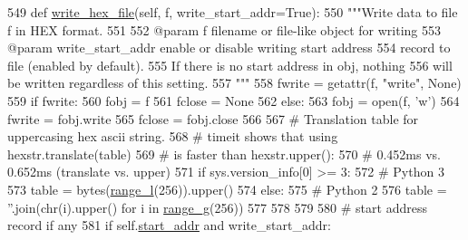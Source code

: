 \begin{DoxyCode}
549     \textcolor{keyword}{def }\hyperlink{classsoftware_1_1chipwhisperer_1_1capture_1_1utils_1_1IntelHex_1_1IntelHex_a8f58a0cbc330f6c0304a291b7ffad1aa}{write\_hex\_file}(self, f, write\_start\_addr=True):
550         \textcolor{stringliteral}{"""Write data to file f in HEX format.}
551 \textcolor{stringliteral}{}
552 \textcolor{stringliteral}{        @param  f                   filename or file-like object for writing}
553 \textcolor{stringliteral}{        @param  write\_start\_addr    enable or disable writing start address}
554 \textcolor{stringliteral}{                                    record to file (enabled by default).}
555 \textcolor{stringliteral}{                                    If there is no start address in obj, nothing}
556 \textcolor{stringliteral}{                                    will be written regardless of this setting.}
557 \textcolor{stringliteral}{        """}
558         fwrite = getattr(f, \textcolor{stringliteral}{"write"}, \textcolor{keywordtype}{None})
559         \textcolor{keywordflow}{if} fwrite:
560             fobj = f
561             fclose = \textcolor{keywordtype}{None}
562         \textcolor{keywordflow}{else}:
563             fobj = open(f, \textcolor{stringliteral}{'w'})
564             fwrite = fobj.write
565             fclose = fobj.close
566 
567         \textcolor{comment}{# Translation table for uppercasing hex ascii string.}
568         \textcolor{comment}{# timeit shows that using hexstr.translate(table)}
569         \textcolor{comment}{# is faster than hexstr.upper():}
570         \textcolor{comment}{# 0.452ms vs. 0.652ms (translate vs. upper)}
571         \textcolor{keywordflow}{if} sys.version\_info[0] >= 3:
572             \textcolor{comment}{# Python 3}
573             table = bytes(\hyperlink{namespacesoftware_1_1chipwhisperer_1_1capture_1_1utils_1_1IntelHex_ae461be5d25f46823cb710380e27eb1a1}{range\_l}(256)).upper()
574         \textcolor{keywordflow}{else}:
575             \textcolor{comment}{# Python 2}
576             table = \textcolor{stringliteral}{''}.join(chr(i).upper() \textcolor{keywordflow}{for} i \textcolor{keywordflow}{in} \hyperlink{namespacesoftware_1_1chipwhisperer_1_1capture_1_1utils_1_1IntelHex_abac275d54b0c0dc47a6ef2f7c4f7bcdf}{range\_g}(256))
577 
578 
579 
580         \textcolor{comment}{# start address record if any}
581         \textcolor{keywordflow}{if} self.\hyperlink{classsoftware_1_1chipwhisperer_1_1capture_1_1utils_1_1IntelHex_1_1IntelHex_a5da95579a9d232f27b10682ef2422316}{start\_addr} \textcolor{keywordflow}{and} write\_start\_addr:

\end{DoxyCode}
